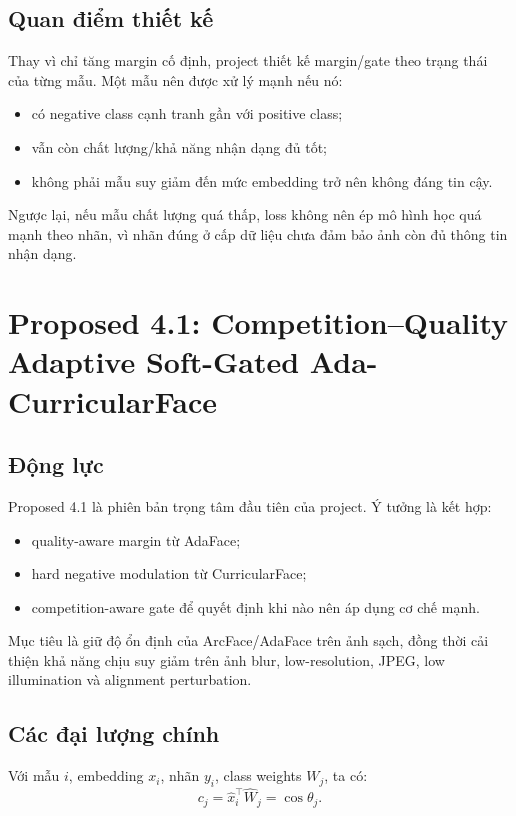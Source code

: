 \documentclass[13pt,a4paper]{extreport}
\begin{document}
\section{Quan điểm thiết kế}
Thay vì chỉ tăng margin cố định, project thiết kế margin/gate theo trạng thái của từng mẫu. Một mẫu nên được xử lý mạnh nếu nó:
\begin{itemize}[leftmargin=1.2cm]
    \item có negative class cạnh tranh gần với positive class;
    \item vẫn còn chất lượng/khả năng nhận dạng đủ tốt;
    \item không phải mẫu suy giảm đến mức embedding trở nên không đáng tin cậy.
\end{itemize}

Ngược lại, nếu mẫu chất lượng quá thấp, loss không nên ép mô hình học quá mạnh theo nhãn, vì nhãn đúng ở cấp dữ liệu chưa đảm bảo ảnh còn đủ thông tin nhận dạng.

\chapter{Proposed 4.1: Competition--Quality Adaptive Soft-Gated Ada-CurricularFace}

\section{Động lực}
Proposed 4.1 là phiên bản trọng tâm đầu tiên của project. Ý tưởng là kết hợp:
\begin{itemize}[leftmargin=1.2cm]
    \item quality-aware margin từ AdaFace;
    \item hard negative modulation từ CurricularFace;
    \item competition-aware gate để quyết định khi nào nên áp dụng cơ chế mạnh.
\end{itemize}

Mục tiêu là giữ độ ổn định của ArcFace/AdaFace trên ảnh sạch, đồng thời cải thiện khả năng chịu suy giảm trên ảnh blur, low-resolution, JPEG, low illumination và alignment perturbation.

\section{Các đại lượng chính}
Với mẫu $i$, embedding $x_i$, nhãn $y_i$, class weights $W_j$, ta có:
\begin{equation}
    c_j = \hat{x}_i^\top \hat{W}_j = \cos\theta_j.
\end{equation}
\end{document}
